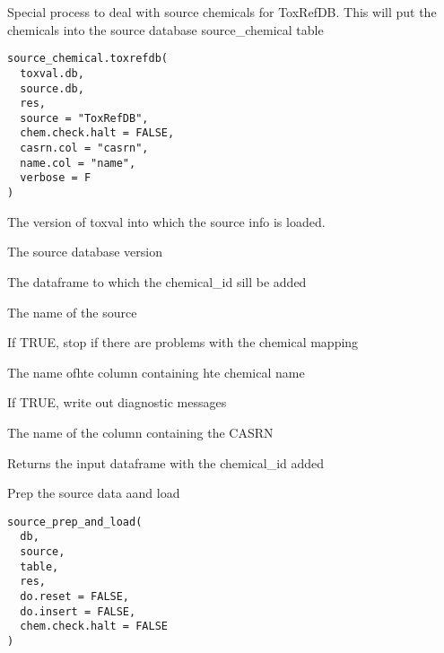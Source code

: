 \documentclass[letterpaper]{book}
\begin{document}
%
\begin{Description}\relax
Special process to deal with source chemicals for ToxRefDB. This will put the
chemicals into the source database source\_chemical table
\end{Description}
%
\begin{Usage}
\begin{verbatim}
source_chemical.toxrefdb(
  toxval.db,
  source.db,
  res,
  source = "ToxRefDB",
  chem.check.halt = FALSE,
  casrn.col = "casrn",
  name.col = "name",
  verbose = F
)
\end{verbatim}
\end{Usage}
%
\begin{Arguments}
\begin{ldescription}
\item[\code{toxval.db}] The version of toxval into which the source info is loaded.

\item[\code{source.db}] The source database version

\item[\code{res}] The dataframe to which the chemical\_id sill be added

\item[\code{source}] The name of the source

\item[\code{chem.check.halt}] If TRUE, stop if there are problems with the chemical mapping

\item[\code{name.col}] The name ofhte column containing hte chemical name

\item[\code{verbose}] If TRUE, write out diagnostic messages

\item[\code{casrncol}] The name of the column containing the CASRN
\end{ldescription}
\end{Arguments}
%
\begin{Value}
Returns the input dataframe with the chemical\_id added
\end{Value}
%
\begin{Description}\relax
Prep the source data aand load
\end{Description}
%
\begin{Usage}
\begin{verbatim}
source_prep_and_load(
  db,
  source,
  table,
  res,
  do.reset = FALSE,
  do.insert = FALSE,
  chem.check.halt = FALSE
)
\end{verbatim}
\end{Usage}
\end{document}
